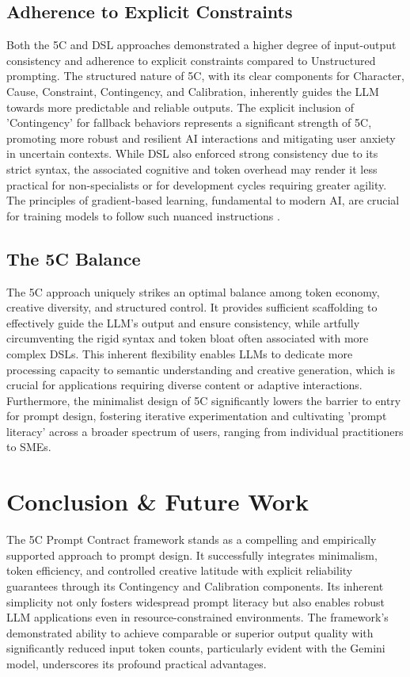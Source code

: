 \documentclass[10pt, a4paper]{article}
\begin{document}
\subsection{Adherence to Explicit Constraints}
Both the 5C and DSL approaches demonstrated a higher degree of input-output consistency and adherence to explicit constraints compared to Unstructured prompting. The structured nature of 5C, with its clear components for Character, Cause, Constraint, Contingency, and Calibration, inherently guides the LLM towards more predictable and reliable outputs. The explicit inclusion of 'Contingency' for fallback behaviors represents a significant strength of 5C, promoting more robust and resilient AI interactions and mitigating user anxiety in uncertain contexts. While DSL also enforced strong consistency due to its strict syntax, the associated cognitive and token overhead may render it less practical for non-specialists or for development cycles requiring greater agility. The principles of gradient-based learning, fundamental to modern AI, are crucial for training models to follow such nuanced instructions \cite{lecun1998gradient}.

\subsection{The 5C Balance}
The 5C approach uniquely strikes an optimal balance among token economy, creative diversity, and structured control. It provides sufficient scaffolding to effectively guide the LLM's output and ensure consistency, while artfully circumventing the rigid syntax and token bloat often associated with more complex DSLs. This inherent flexibility enables LLMs to dedicate more processing capacity to semantic understanding and creative generation, which is crucial for applications requiring diverse content or adaptive interactions. Furthermore, the minimalist design of 5C significantly lowers the barrier to entry for prompt design, fostering iterative experimentation and cultivating 'prompt literacy' across a broader spectrum of users, ranging from individual practitioners to SMEs.

\section{Conclusion \& Future Work}
The 5C Prompt Contract framework stands as a compelling and empirically supported approach to prompt design. It successfully integrates minimalism, token efficiency, and controlled creative latitude with explicit reliability guarantees through its Contingency and Calibration components. Its inherent simplicity not only fosters widespread prompt literacy but also enables robust LLM applications even in resource-constrained environments. The framework's demonstrated ability to achieve comparable or superior output quality with significantly reduced input token counts, particularly evident with the Gemini model, underscores its profound practical advantages.
\end{document}
